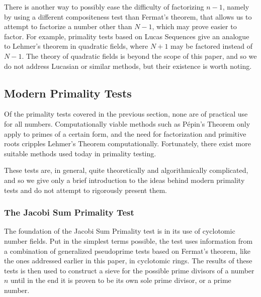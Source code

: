 \documentclass{article}
\begin{document}
\par There is another way to possibly ease the difficulty of factorizing $n - 1$, namely by using a different compositeness test than Fermat's theorem, that allows us to attempt to factorize a number other than $N - 1$, which may prove easier to factor. For example, primality tests based on Lucas Sequences give an analogue to Lehmer's theorem in quadratic fields, where $N+1$ may be factored instead of $N-1$. The theory of quadratic fields is beyond the scope of this paper, and so we do not address Lucasian or similar methods, but their existence is worth noting.



\subsection*{Modern Primality Tests}

\par Of the primality tests covered in the previous section, none are of practical use for all numbers. Computationally viable methods such as P\'{e}pin's Theorem only apply to primes of a certain form, and the need for factorization and primitive roots cripples Lehmer's Theorem computationally. Fortunately, there exist more suitable methods used today in primality testing. 
\par These tests are, in general, quite theoretically and algorithmically complicated, and so we give only a brief introduction to the ideas behind modern primality tests and do not attempt to rigorously present them.

\subsubsection*{The Jacobi Sum Primality Test}

\par The foundation of the Jacobi Sum Primality test is in its use of cyclotomic number fields. Put in the simplest terms possible, the test uses information from a combination of generalized pseudoprime tests based on Fermat's theorem, like the ones addressed earlier in this paper, in cyclotomic rings. The results of these tests is then used to construct a sieve for the possible prime divisors of a number $n$ until in the end it is proven to be its own sole prime divisor, or a prime number. 
\end{document}
